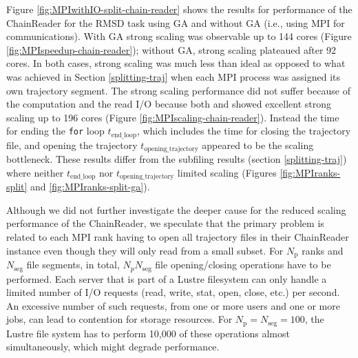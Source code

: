 Figure \ref{fig:MPIwithIO-split-chain-reader} shows the results for performance of the ChainReader for the RMSD task using GA and without GA (i.e., using MPI for communications). 
With GA strong scaling was observable up to 144 cores (Figure \ref{fig:MPIspeedup-chain-reader}); without GA, strong scaling plateaued after 92 cores.
In both cases, strong scaling was much less than ideal as opposed to what was achieved in Section \ref{splitting-traj} when each MPI process was assigned its own trajectory segment. 
The strong scaling performance did not suffer because of the computation and the read I/O because both \tcomp and \tIO showed excellent strong scaling up to 196 cores (Figure \ref{fig:MPIscaling-chain-reader}).
Instead the time for ending the \texttt{for} loop $t_{\text{end\_loop}}$, which includes the time for closing the trajectory file, and opening the trajectory $t_{\text{opening\_trajectory}}$ appeared to be the scaling bottleneck.
These results differ from the subfiling results (section \ref{splitting-traj}) where neither $t_{\text{end\_loop}}$ nor $t_{\text{opening\_trajectory}}$ limited scaling (Figures \ref{fig:MPIranks-split} and \ref{fig:MPIranks-split-ga}). 

Although we did not further investigate the deeper cause for the reduced scaling performance of the ChainReader, we speculate that the primary problem is related to each MPI rank having to open all trajectory files in their ChainReader instance even though they will only read from a small subset.
For $N_{\text{p}}$ ranks and $N_{\text{seg}}$ file segments, in total, $N_{p } N_{\text{seg}}$ file opening/closing operations have to be performed. 
Each server that is part of a Lustre filesystem can only handle a limited number of I/O requests (read, write, stat, open, close, etc.) per second.
An excessive number of such requests, from one or more users and one or more jobs, can lead to contention for storage resources. 
For $N_{\text{p}} = N_{\text{seg}} = 100$, the Lustre file system has to perform 10,000 of these operations almost simultaneously, which might degrade performance. 


